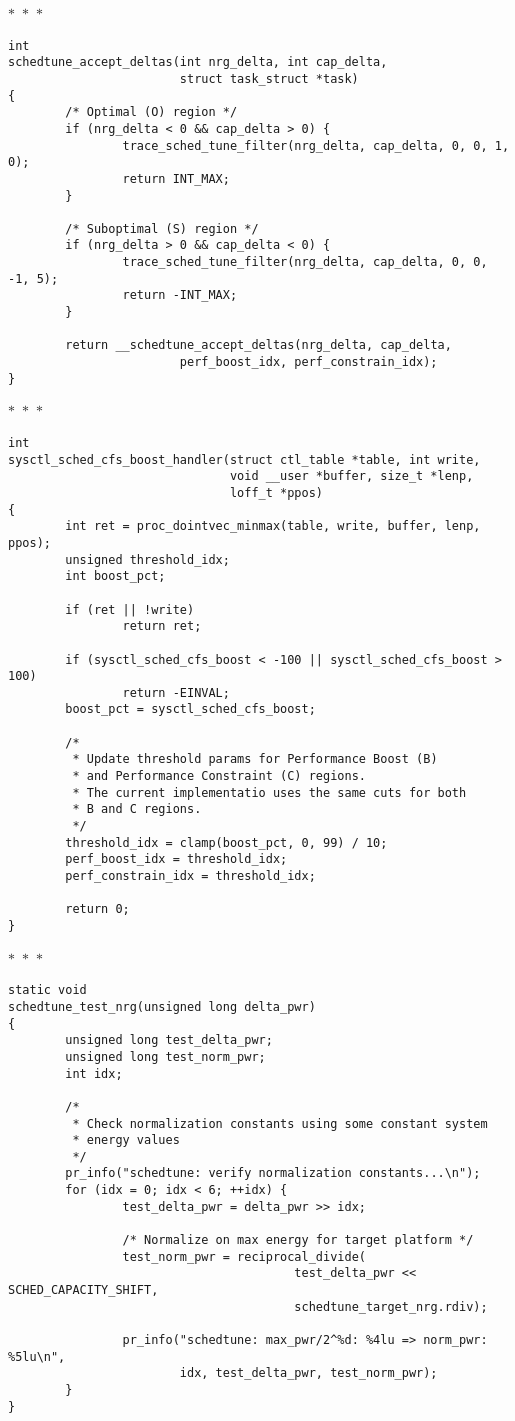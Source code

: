 \documentclass{article}
\newcommand{\divider}{{\begin{center}
  $\ast$~$\ast$~$\ast$
\end{center}}}
\begin{document}
\divider
\begin{verbatim}
int
schedtune_accept_deltas(int nrg_delta, int cap_delta,
                        struct task_struct *task)
{
        /* Optimal (O) region */
        if (nrg_delta < 0 && cap_delta > 0) {
                trace_sched_tune_filter(nrg_delta, cap_delta, 0, 0, 1, 0);
                return INT_MAX;
        }

        /* Suboptimal (S) region */
        if (nrg_delta > 0 && cap_delta < 0) {
                trace_sched_tune_filter(nrg_delta, cap_delta, 0, 0, -1, 5);
                return -INT_MAX;
        }

        return __schedtune_accept_deltas(nrg_delta, cap_delta,
                        perf_boost_idx, perf_constrain_idx);
}
\end{verbatim}
\divider
\begin{verbatim}
int
sysctl_sched_cfs_boost_handler(struct ctl_table *table, int write,
                               void __user *buffer, size_t *lenp,
                               loff_t *ppos)
{
        int ret = proc_dointvec_minmax(table, write, buffer, lenp, ppos);
        unsigned threshold_idx;
        int boost_pct;

        if (ret || !write)
                return ret;

        if (sysctl_sched_cfs_boost < -100 || sysctl_sched_cfs_boost > 100)
                return -EINVAL;
        boost_pct = sysctl_sched_cfs_boost;

        /*
         * Update threshold params for Performance Boost (B)
         * and Performance Constraint (C) regions.
         * The current implementatio uses the same cuts for both
         * B and C regions.
         */
        threshold_idx = clamp(boost_pct, 0, 99) / 10;
        perf_boost_idx = threshold_idx;
        perf_constrain_idx = threshold_idx;

        return 0;
}
\end{verbatim}
\divider
\begin{verbatim}
static void
schedtune_test_nrg(unsigned long delta_pwr)
{
        unsigned long test_delta_pwr;
        unsigned long test_norm_pwr;
        int idx;

        /*
         * Check normalization constants using some constant system
         * energy values
         */
        pr_info("schedtune: verify normalization constants...\n");
        for (idx = 0; idx < 6; ++idx) {
                test_delta_pwr = delta_pwr >> idx;

                /* Normalize on max energy for target platform */
                test_norm_pwr = reciprocal_divide(
                                        test_delta_pwr << SCHED_CAPACITY_SHIFT,
                                        schedtune_target_nrg.rdiv);

                pr_info("schedtune: max_pwr/2^%d: %4lu => norm_pwr: %5lu\n",
                        idx, test_delta_pwr, test_norm_pwr);
        }
}
\end{verbatim}
\end{document}
